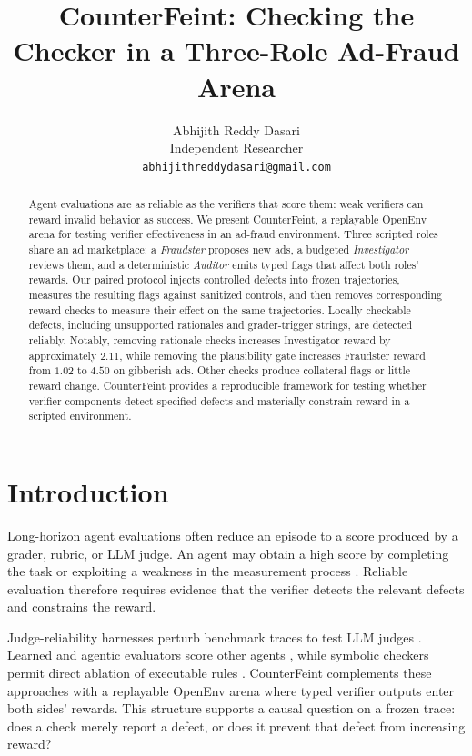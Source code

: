\documentclass{article}
\title{CounterFeint: Checking the Checker in a Three-Role Ad-Fraud Arena}
\author{%
  Abhijith Reddy Dasari \\
  Independent Researcher \\
  \texttt{abhijithreddydasari@gmail.com}
}
\begin{document}
\nolinenumbers
\raggedbottom
\maketitle

\begin{abstract}
Agent evaluations are as reliable as the verifiers that score them: weak verifiers can reward invalid behavior as success. We present CounterFeint, a replayable OpenEnv arena for testing verifier effectiveness in an ad-fraud environment. Three scripted roles share an ad marketplace: a \emph{Fraudster} proposes new ads, a budgeted \emph{Investigator} reviews them, and a deterministic \emph{Auditor} emits typed flags that affect both roles' rewards. Our paired protocol injects controlled defects into frozen trajectories, measures the resulting flags against sanitized controls, and then removes corresponding reward checks to measure their effect on the same trajectories. Locally checkable defects, including unsupported rationales and grader-trigger strings, are detected reliably. Notably, removing rationale checks increases Investigator reward by approximately $2.11$, while removing the plausibility gate increases Fraudster reward from $1.02$ to $4.50$ on gibberish ads. Other checks produce collateral flags or little reward change. CounterFeint provides a reproducible framework for testing whether verifier components detect specified defects and materially constrain reward in a scripted environment.
\end{abstract}

\section{Introduction}
\label{sec:intro}

Long-horizon agent evaluations often reduce an episode to a score produced by a grader, rubric, or LLM judge. An agent may obtain a high score by completing the task or exploiting a weakness in the measurement process \citep{skalse2022defining,pan2022effects}. Reliable evaluation therefore requires evidence that the verifier detects the relevant defects and constrains the reward.

Judge-reliability harnesses perturb benchmark traces to test LLM judges \citep{dev2026jrh,zhao2025onetoken}. Learned and agentic evaluators score other agents \citep{shi2026ajbench,luo2025agentauditor}, while symbolic checkers permit direct ablation of executable rules \citep{wang2026auditflow}. CounterFeint complements these approaches with a replayable OpenEnv arena \citep{openenv2026} where typed verifier outputs enter both sides' rewards. This structure supports a causal question on a frozen trace: does a check merely report a defect, or does it prevent that defect from increasing reward?
\end{document}
